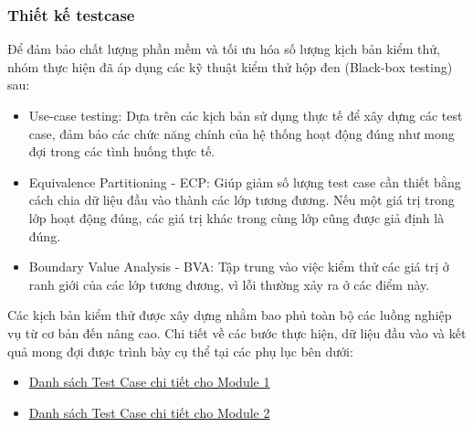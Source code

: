 \subsubsection{Thiết kế testcase}
Để đảm bảo chất lượng phần mềm và tối ưu hóa số lượng kịch bản kiểm thử, nhóm thực hiện đã áp dụng các kỹ thuật kiểm thử hộp đen (Black-box testing) sau:
\begin{itemize}
    \item Use-case testing: Dựa trên các kịch bản sử dụng thực tế để xây dựng các test case, đảm bảo các chức năng chính của hệ thống hoạt động đúng như mong đợi trong các tình huống thực tế.
    \item Equivalence Partitioning - ECP: Giúp giảm số lượng test case cần thiết bằng cách chia dữ liệu đầu vào thành các lớp tương đương. Nếu một giá trị trong lớp hoạt động đúng, các giá trị khác trong cùng lớp cũng được giả định là đúng.
    \item Boundary Value Analysis - BVA: Tập trung vào việc kiểm thử các giá trị ở ranh giới của các lớp tương đương, vì lỗi thường xảy ra ở các điểm này.
\end{itemize}

Các kịch bản kiểm thử được xây dựng nhằm bao phủ toàn bộ các luồng nghiệp vụ từ cơ bản đến nâng cao. Chi tiết về các bước thực hiện, dữ liệu đầu vào và kết quả mong đợi được trình bày cụ thể tại các phụ lục bên dưới:
\begin{itemize}
    \item \hyperlink{target:tc_m1}{Danh sách Test Case chi tiết cho Module 1}
    \item \hyperlink{target:tc_m2}{Danh sách Test Case chi tiết cho Module 2}
\end{itemize}





